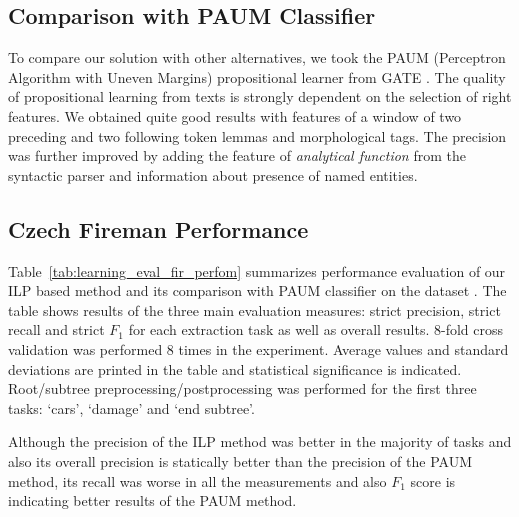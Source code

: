 \subsection{Comparison with PAUM Classifier}
To compare our solution with other alternatives, we took the PAUM (Perceptron Algorithm with Uneven Margins) propositional learner from GATE \citep{Li:Paum}. The quality of propositional learning from texts is strongly dependent on the selection of right features. We obtained quite good results with features of a window of two preceding and two following token lemmas and morphological tags. The precision was further improved by adding the feature of \emph{analytical function} from the syntactic parser and information about presence of named entities.




\subsection{Czech Fireman Performance}

Table~\ref{tab:learning_eval_fir_perfom} summarizes performance evaluation of our ILP based method and its comparison with PAUM classifier on the dataset . The table shows results of the three main evaluation measures: strict precision, strict recall and strict $F_1$ for each extraction task as well as overall results. 8-fold cross validation was performed 8 times in the experiment. Average values and standard deviations are printed in the table and statistical significance is indicated. Root/subtree preprocessing/postprocessing was performed for the first three tasks: `cars’, `damage’ and `end subtree’.

Although the precision of the ILP method was better in the majority of tasks and also its overall precision is statically better than the precision of the PAUM method, its recall was worse in all the measurements and also $F_1$ score is indicating better results of the PAUM method. 


